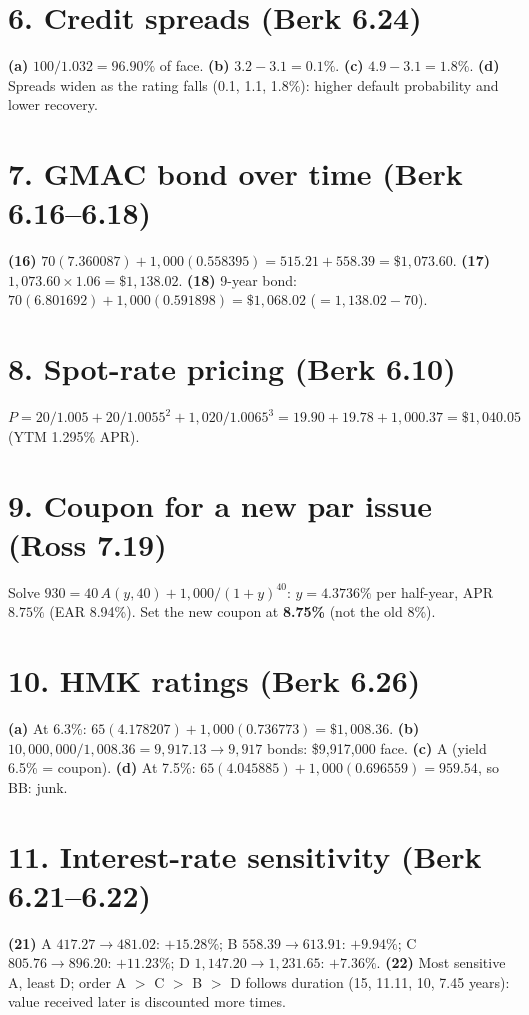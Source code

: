 \documentclass[11pt,a4paper]{article}
\begin{document}
\section*{6. Credit spreads (Berk 6.24)}
\textbf{(a)} $100/1.032=96.90\%$ of face. \textbf{(b)} $3.2-3.1=0.1\%$. \textbf{(c)} $4.9-3.1=1.8\%$.
\textbf{(d)} Spreads widen as the rating falls (0.1, 1.1, 1.8\%): higher default probability and lower recovery.

\section*{7. GMAC bond over time (Berk 6.16--6.18)}
\textbf{(16)} $70(7.360087)+1{,}000(0.558395)=515.21+558.39=\$1{,}073.60$.
\textbf{(17)} $1{,}073.60\times1.06=\$1{,}138.02$. \textbf{(18)} 9-year bond: $70(6.801692)+1{,}000(0.591898)=\$1{,}068.02$ ($=1{,}138.02-70$).

\section*{8. Spot-rate pricing (Berk 6.10)}
$P=20/1.005+20/1.0055^2+1{,}020/1.0065^3=19.90+19.78+1{,}000.37=\$1{,}040.05$ (YTM 1.295\% APR).

\section*{9. Coupon for a new par issue (Ross 7.19)}
Solve $930=40\,A(y,40)+1{,}000/(1+y)^{40}$: $y=4.3736\%$ per half-year, APR $8.75\%$ (EAR 8.94\%).
Set the new coupon at \textbf{8.75\%} (not the old 8\%).

\section*{10. HMK ratings (Berk 6.26)}
\textbf{(a)} At 6.3\%: $65(4.178207)+1{,}000(0.736773)=\$1{,}008.36$.
\textbf{(b)} $10{,}000{,}000/1{,}008.36=9{,}917.13\to9{,}917$ bonds: \$9,917,000 face.
\textbf{(c)} A (yield 6.5\% = coupon). \textbf{(d)} At 7.5\%: $65(4.045885)+1{,}000(0.696559)=959.54$, so BB: junk.

\section*{11. Interest-rate sensitivity (Berk 6.21--6.22)}
\textbf{(21)} A $417.27\to481.02$: $+15.28\%$; B $558.39\to613.91$: $+9.94\%$; C $805.76\to896.20$: $+11.23\%$;
D $1{,}147.20\to1{,}231.65$: $+7.36\%$. \textbf{(22)} Most sensitive A, least D; order A $>$ C $>$ B $>$ D follows
duration (15, 11.11, 10, 7.45 years): value received later is discounted more times.
\end{document}
